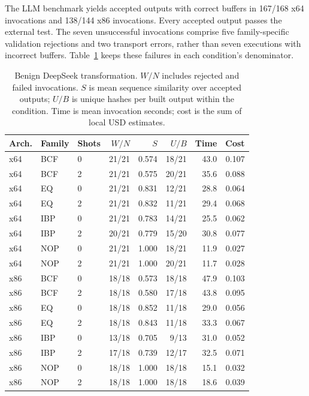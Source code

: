 The LLM benchmark yields accepted outputs with correct buffers in 167/168
x64 invocations and 138/144 x86 invocations. Every accepted output passes
the external test. The seven unsuccessful invocations comprise five
family-specific validation rejections and two transport errors, rather
than seven executions with incorrect buffers. Table~\ref{tab:new_llm_benign}
keeps these failures in each condition's denominator.


\begin{table}[t]
\caption{Benign DeepSeek transformation. $W/N$ includes rejected and
failed invocations. $S$ is mean sequence similarity over accepted outputs;
$U/B$ is unique hashes per built output within the condition. Time is
mean invocation seconds; cost is the sum of local USD estimates.}
\label{tab:new_llm_benign}
\centering\small\setlength{\tabcolsep}{4pt}
\begin{tabular}{@{}lllrrrrr@{}}
\toprule
Arch. & Family & Shots & $W/N$ & $S$ & $U/B$ & Time & Cost \\
\midrule
x64 & BCF & 0 & 21/21 & 0.574 & 18/21 & 43.0 & 0.107 \\
x64 & BCF & 2 & 21/21 & 0.575 & 20/21 & 35.6 & 0.088 \\
x64 & EQ & 0 & 21/21 & 0.831 & 12/21 & 28.8 & 0.064 \\
x64 & EQ & 2 & 21/21 & 0.832 & 11/21 & 29.4 & 0.068 \\
x64 & IBP & 0 & 21/21 & 0.783 & 14/21 & 25.5 & 0.062 \\
x64 & IBP & 2 & 20/21 & 0.779 & 15/20 & 30.8 & 0.077 \\
x64 & NOP & 0 & 21/21 & 1.000 & 18/21 & 11.9 & 0.027 \\
x64 & NOP & 2 & 21/21 & 1.000 & 20/21 & 11.7 & 0.028 \\
x86 & BCF & 0 & 18/18 & 0.573 & 18/18 & 47.9 & 0.103 \\
x86 & BCF & 2 & 18/18 & 0.580 & 17/18 & 43.8 & 0.095 \\
x86 & EQ & 0 & 18/18 & 0.852 & 11/18 & 29.0 & 0.056 \\
x86 & EQ & 2 & 18/18 & 0.843 & 11/18 & 33.3 & 0.067 \\
x86 & IBP & 0 & 13/18 & 0.705 & 9/13 & 31.0 & 0.052 \\
x86 & IBP & 2 & 17/18 & 0.739 & 12/17 & 32.5 & 0.071 \\
x86 & NOP & 0 & 18/18 & 1.000 & 18/18 & 15.1 & 0.032 \\
x86 & NOP & 2 & 18/18 & 1.000 & 18/18 & 18.6 & 0.039 \\
\bottomrule
\end{tabular}
\end{table}


